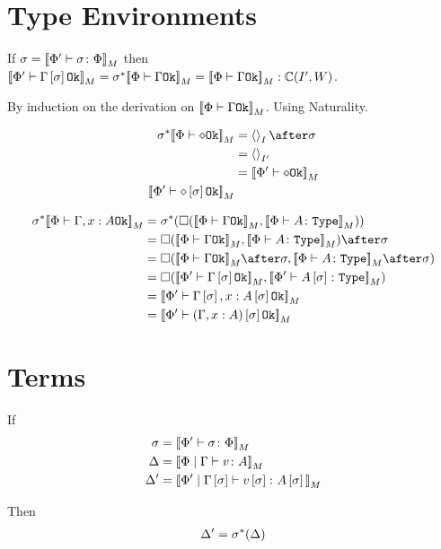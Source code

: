 \documentclass{report}
\newcommand\type[0]{\texttt{Type}}
\newcommand\cipw[0]{\C(I', W)}
\renewcommand\star[0]{^*}
\begin{document}
\section{Type Environments}
If $\sigma = {\bf [\![}\Phi' \vdash \sigma \colon \Phi{\bf ]\!]}_M$ then $\deno{\wellformedok{\P'}{\G\ssi}} = \si\star\deno{\wellformedok{\P}{\G}} = \deno{\wellformedok{\P}{\G}}: \cipw$.

\proof
By induction on the derivation on ${\bf [\![}\Phi\vdash \Gamma \texttt{Ok}{\bf ]\!]}_M$. Using Naturality.

\begin{align}
    \si\star\deno{\wellformedok{\P}{\nil}} &= \term{I}\after\si\\
    &= \term{I'}\\
    &= \deno{\wellformedok{\P'}{\nil}}\\
    \deno{\wellformedok{\P'}{\nil\ssi}}\\
\end{align}

\begin{align}
   \si\star\deno{\wellformedok{\P}{\gax}} &= \si\star(\square(\deno{\wellformedok{\P}{\G}},\deno{\typerelation{\P}{A}{\type}})) \\
    & = \square(\deno{\wellformedok{\P}{\G}},\deno{\typerelation{\P}{A}{\type}})\after\si\\
   & = \square(\deno{\wellformedok{\P}{\G}}\after\si, \deno{\typerelation{\P}{A}{\type}}\after\si)\\
    & = \square(\deno{\wellformedok{\P'}{\G\ssi}},\deno{\typerelation{\P'}{A\ssi}{\type}})\\
    & = \deno{\wellformedok{\P'}{\G\ssi, x: A\ssi}}\\
    & = \deno{\wellformedok{\P'}{(\gax)\ssi}}\\
\end{align}

\section{Terms}
If 
\begin{align}
    \sigma &= {\bf [\![}\Phi' \vdash \sigma \colon \Phi{\bf ]\!]}_M\\
    \Delta &= {\bf [\![}\Phi\mid\Gamma \vdash v \colon A{\bf ]\!]}_M\\
    \Delta' &= {\bf [\![}\Phi'\mid\Gamma\left[\sigma\right] \vdash v\left[\sigma\right] \colon A\left[\sigma\right]{\bf ]\!]}_M\\
\end{align}

Then \begin{eqnarray}
    \D' = \si\star(\D)
\end{eqnarray}
\end{document}
